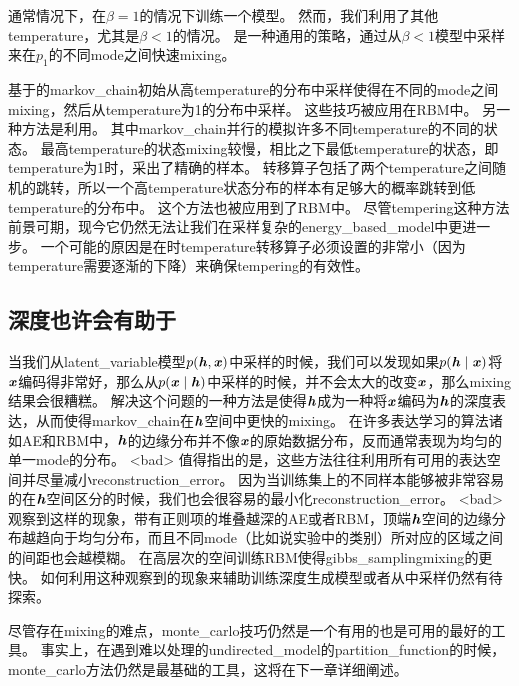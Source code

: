 通常情况下，在$\beta = 1$的情况下训练一个模型。
然而，我们利用了其他\gls{temperature}，尤其是$\beta < 1$的情况。
是一种通用的策略，通过从$\beta<1$模型中采样来在$p_1$的不同\gls{mode}之间快速\gls{mixing}。

基于\citep{Neal94b}的\gls{markov_chain}初始从高\gls{temperature}的分布中采样使得在不同的\gls{mode}之间\gls{mixing}，然后从\gls{temperature}为1的分布中采样。
这些技巧被应用在\gls{RBM}中\citep{Salakhutdinov-2010}。
另一种方法是利用\citep{Iba-2001}。
其中\gls{markov_chain}并行的模拟许多不同\gls{temperature}的不同的状态。
最高\gls{temperature}的状态\gls{mixing}较慢，相比之下最低\gls{temperature}的状态，即\gls{temperature}为1时，采出了精确的样本。
转移算子包括了两个\gls{temperature}之间随机的跳转，所以一个高\gls{temperature}状态分布的样本有足够大的概率跳转到低\gls{temperature}的分布中。
这个方法也被应用到了\gls{RBM}中\citep{Desjardins+al-2010-small,Cho10IJCNN}。
尽管\gls{tempering}这种方法前景可期，现今它仍然无法让我们在采样复杂的\gls{energy_based_model}中更进一步。
一个可能的原因是在时\gls{temperature}转移算子必须设置的非常小（因为\gls{temperature}需要逐渐的下降）来确保\gls{tempering}的有效性。



\subsection{深度也许会有助于}
\label{sec:depth_may_help_mixing}

当我们从\gls{latent_variable}模型$p(\boldsymbol{\mathit{h}},\boldsymbol{\mathit{x}})$中采样的时候，我们可以发现如果$p(\boldsymbol{\mathit{h}}\mid \boldsymbol{\mathit{x}})$将$\boldsymbol{\mathit{x}}$编码得非常好，那么从$p(\boldsymbol{\mathit{x}} \mid \boldsymbol{\mathit{h}})$中采样的时候，并不会太大的改变$\boldsymbol{\mathit{x}}$，那么\gls{mixing}结果会很糟糕。
解决这个问题的一种方法是使得$\boldsymbol{\mathit{h}}$成为一种将$\boldsymbol{\mathit{x}}$编码为$\boldsymbol{\mathit{h}}$的深度表达，从而使得\gls{markov_chain}在$\boldsymbol{\mathit{h}}$空间中更快的\gls{mixing}。
在许多表达学习的算法诸如\gls{AE}和\gls{RBM}中，$\boldsymbol{\mathit{h}}$的边缘分布并不像$\boldsymbol{\mathit{x}}$的原始数据分布，反而通常表现为均匀的单一\gls{mode}的分布。
<bad> 值得指出的是，这些方法往往利用所有可用的表达空间并尽量减小\gls{reconstruction_error}。
因为当训练集上的不同样本能够被非常容易的在$\boldsymbol{\mathit{h}}$空间区分的时候，我们也会很容易的最小化\gls{reconstruction_error}。
<bad> \citep{Bengio-et-al-ICML2013-small}观察到这样的现象，带有正则项的堆叠越深的\gls{AE}或者\gls{RBM}，顶端$\boldsymbol{\mathit{h}}$空间的边缘分布越趋向于均匀分布，而且不同\gls{mode}（比如说实验中的类别）所对应的区域之间的间距也会越模糊。
在高层次的空间训练\gls{RBM}使得\gls{gibbs_sampling}\gls{mixing}的更快。
如何利用这种观察到的现象来辅助训练深度生成模型或者从中采样仍然有待探索。

尽管存在\gls{mixing}的难点，\gls{monte_carlo}技巧仍然是一个有用的也是可用的最好的工具。
事实上，在遇到难以处理的\gls{undirected_model}的\gls{partition_function}的时候，\gls{monte_carlo}方法仍然是最基础的工具，这将在下一章详细阐述。













